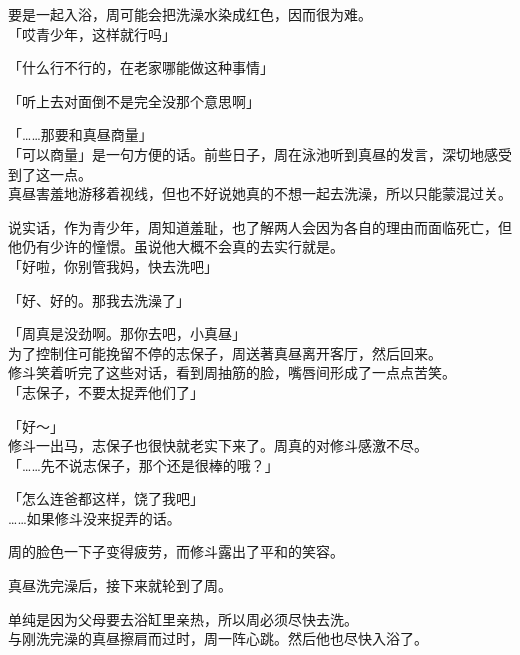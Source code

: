 要是一起入浴，周可能会把洗澡水染成红色，因而很为难。\\

「哎青少年，这样就行吗」

「什么行不行的，在老家哪能做这种事情」

「听上去对面倒不是完全没那个意思啊」

「……那要和真昼商量」\\

「可以商量」是一句方便的话。前些日子，周在泳池听到真昼的发言，深切地感受到了这一点。\\

真昼害羞地游移着视线，但也不好说她真的不想一起去洗澡，所以只能蒙混过关。

说实话，作为青少年，周知道羞耻，也了解两人会因为各自的理由而面临死亡，但他仍有少许的憧憬。虽说他大概不会真的去实行就是。\\

「好啦，你别管我妈，快去洗吧」

「好、好的。那我去洗澡了」

「周真是没劲啊。那你去吧，小真昼」\\

为了控制住可能挽留不停的志保子，周送著真昼离开客厅，然后回来。\\

修斗笑着听完了这些对话，看到周抽筋的脸，嘴唇间形成了一点点苦笑。\\

「志保子，不要太捉弄他们了」

「好～」\\

修斗一出马，志保子也很快就老实下来了。周真的对修斗感激不尽。\\

「……先不说志保子，那个还是很棒的哦？」

「怎么连爸都这样，饶了我吧」\\

……如果修斗没来捉弄的话。

周的脸色一下子变得疲劳，而修斗露出了平和的笑容。\\

\vspace{2\baselineskip}

真昼洗完澡后，接下来就轮到了周。

单纯是因为父母要去浴缸里亲热，所以周必须尽快去洗。\\

与刚洗完澡的真昼擦肩而过时，周一阵心跳。然后他也尽快入浴了。

